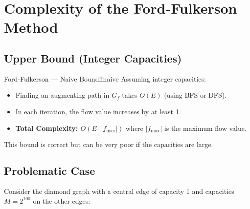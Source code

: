 
\section*{Complexity of the Ford-Fulkerson Method}

\subsection{Upper Bound (Integer Capacities)}

\begin{complexity}{Ford-Fulkerson — Naive Bound}{ffnaive}
Assuming integer capacities:
\begin{itemize}[noitemsep]
  \item Finding an augmenting path in $G_f$ takes $O(E)$ (using BFS or DFS).
  \item In each iteration, the flow value increases by at least 1.
  \item \textbf{Total Complexity: $O(E \cdot |f_{\max}|)$} where $|f_{\max}|$ is the 
        maximum flow value.
\end{itemize}
\end{complexity}

This bound is correct but can be very poor if the capacities are large.

\subsection{Problematic Case}

Consider the diamond graph with a central edge of capacity 1 and 
capacities $M = 2^{100}$ on the other edges:

\begin{center}
\end{center}

